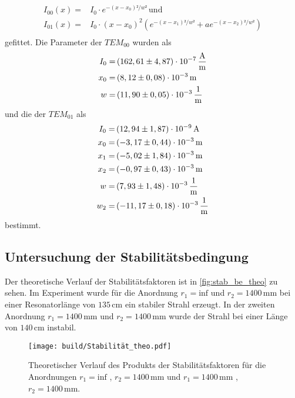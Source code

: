 \begin{align*}
    I_{00}(x) =& I_0 \cdot e^{-(x-x_0)²/w ²} \, \text{und} \\
    I_{01}(x) =& I_0 \cdot (x-x_{0})^2 \left( e^{-(x-x_1)²/w ²} + a e^{-(x-x_2)²/w ²} \right) \\
\end{align*}
gefittet.
Die Parameter der $TEM_{00}$  wurden als 
\begin{align*}
   I_0 =& \left( 162,61 \pm 4,87 \right) \cdot 10^{-7} \, \dfrac{\unit{\ampere}}{\unit{\meter}} \\
   x_0 =& \left( 8,12   \pm 0,08 \right) \cdot 10^{-3} \, \unit{\meter}                         \\
   w   =& \left(11,90   \pm 0,05 \right) \cdot 10^{-3} \, \unit{\dfrac{1}{\meter}}              \\
\end{align*}
und die der $TEM_{01}$ als
\begin{align*}
    I_0 =& \left( 12,94  \pm 1,87 \right) \cdot 10^{-9} \, \unit{\ampere}           \\
    x_0 =& \left( -3,17  \pm 0,44 \right) \cdot 10^{-3} \, \unit{\meter}            \\
    x_1 =& \left( -5,02  \pm 1,84 \right) \cdot 10^{-3} \, \unit{\meter}            \\
    x_2 =& \left( -0,97  \pm 0,43 \right) \cdot 10^{-3} \, \unit{\meter}            \\
    w   =& \left(  7,93  \pm 1,48 \right) \cdot 10^{-3} \, \unit{\dfrac{1}{\meter}} \\
    w_2 =& \left(-11,17  \pm 0,18 \right) \cdot 10^{-3} \, \unit{\dfrac{1}{\meter}} \\
 \end{align*}
 bestimmt.

\subsection{Untersuchung der Stabilitätsbedingung}
\label{sec:Stab_be}
Der theoretische Verlauf der Stabilitätsfaktoren ist in \autoref{fig:stab_be_theo} zu sehen.
Im Experiment wurde für die Anordnung $r_1 = \text{inf}$ und $r_2 = 1400 \, \unit{\milli\meter}$ bei einer Resonatorlänge von $135 \, \unit{\centi\meter}$ ein stabiler Strahl erzeugt.
In der zweiten Anordnung $r_1 = 1400 \, \unit{\milli\meter}$ und $r_2 = 1400 \, \unit{\milli\meter}$ wurde der Strahl bei einer Länge von $140 \, \unit{\centi\meter}$ instabil.
 \begin{figure}[H]
    \centering
    \texttt{[image: build/Stabilität\_theo.pdf]}
    \caption{Theoretischer Verlauf des Produkts der Stabilitätsfaktoren für die Anordnungen $r_1 = \text{inf}$ , $r_2 = 1400 \, \unit{\milli\meter}$ und $r_1 = 1400 \, \unit{\milli\meter}$ , $r_2 = 1400 \, \unit{\milli\meter}$.}
    \label{fig:stab_be_theo}
\end{figure}

